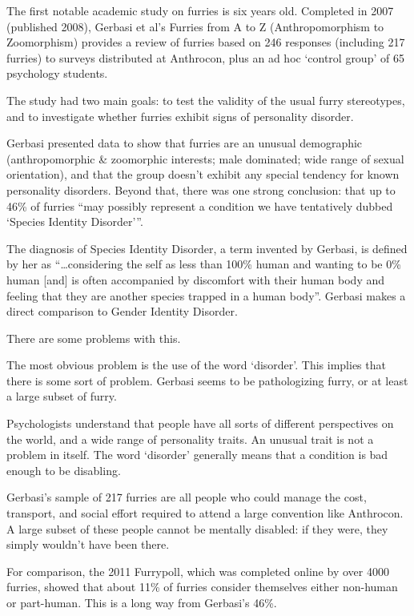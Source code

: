 
The first notable academic study on furries is six years old. Completed in 2007 (published 2008), Gerbasi et al's Furries from A to Z (Anthropomorphism to Zoomorphism) provides a review of furries based on 246 responses (including 217 furries) to surveys distributed at Anthrocon, plus an ad hoc `control group' of 65 psychology students.

The study had two main goals: to test the validity of the usual furry stereotypes, and to investigate whether furries exhibit signs of personality disorder.

Gerbasi presented data to show that furries are an unusual demographic (anthropomorphic \& zoomorphic interests; male dominated; wide range of sexual orientation), and that the group doesn't exhibit any special tendency for known personality disorders. Beyond that, there was one strong conclusion: that up to 46\% of furries ``may possibly represent a condition we have tentatively dubbed `Species Identity Disorder'''.

The diagnosis of Species Identity Disorder, a term invented by Gerbasi, is defined by her as ``\ldots considering the self as less than 100\% human and wanting to be 0\% human [and] is often accompanied by discomfort with their human body and feeling that they are another species trapped in a human body''. Gerbasi makes a direct comparison to Gender Identity Disorder.

There are some problems with this.

The most obvious problem is the use of the word `disorder'. This implies that there is some sort of problem. Gerbasi seems to be pathologizing furry, or at least a large subset of furry.

Psychologists understand that people have all sorts of different perspectives on the world, and a wide range of personality traits. An unusual trait is not a problem in itself. The word `disorder' generally means that a condition is bad enough to be disabling.

Gerbasi's sample of 217 furries are all people who could manage the cost, transport, and social effort required to attend a large convention like Anthrocon. A large subset of these people cannot be mentally disabled: if they were, they simply wouldn't have been there.

For comparison, the 2011 Furrypoll, which was completed online by over 4000 furries, showed that about 11\% of furries consider themselves either non-human or part-human. This is a long way from Gerbasi's 46\%.

